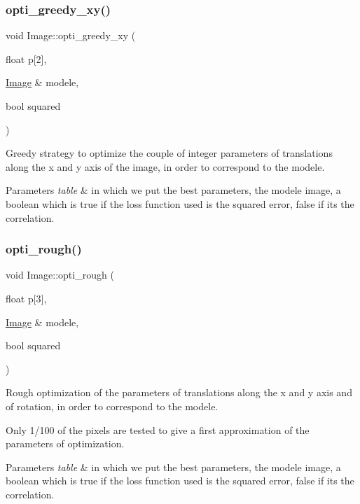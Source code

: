 \subsubsection{\texorpdfstring{opti\+\_\+greedy\+\_\+xy()}{opti\_greedy\_xy()}}
{\footnotesize\ttfamily void Image\+::opti\+\_\+greedy\+\_\+xy (\begin{DoxyParamCaption}\item[{float}]{p\mbox{[}2\mbox{]},  }\item[{\hyperlink{class_image}{Image} \&}]{modele,  }\item[{bool}]{squared }\end{DoxyParamCaption})}



Greedy strategy to optimize the couple of integer parameters of translations along the x and y axis of the image, in order to correspond to the modele. 


\begin{DoxyParams}{Parameters}
{\em table} & in which we put the best parameters, the modele image, a boolean which is true if the loss function used is the squared error, false if it\textquotesingle{}s the correlation. \\
\hline
\end{DoxyParams}
\mbox{\label{class_image_a9a9dc134dea9ed94a2f0717bbbdc203d}} 
\subsubsection{\texorpdfstring{opti\+\_\+rough()}{opti\_rough()}}
{\footnotesize\ttfamily void Image\+::opti\+\_\+rough (\begin{DoxyParamCaption}\item[{float}]{p\mbox{[}3\mbox{]},  }\item[{\hyperlink{class_image}{Image} \&}]{modele,  }\item[{bool}]{squared }\end{DoxyParamCaption})}



Rough optimization of the parameters of translations along the x and y axis and of rotation, in order to correspond to the modele. 

Only 1/100 of the pixels are tested to give a first approximation of the parameters of optimization.


\begin{DoxyParams}{Parameters}
{\em table} & in which we put the best parameters, the modele image, a boolean which is true if the loss function used is the squared error, false if it\textquotesingle{}s the correlation. \\
\hline
\end{DoxyParams}
\mbox{\label{class_image_a0ee02279d63183fcc4222f47bd49b1d2}} 
